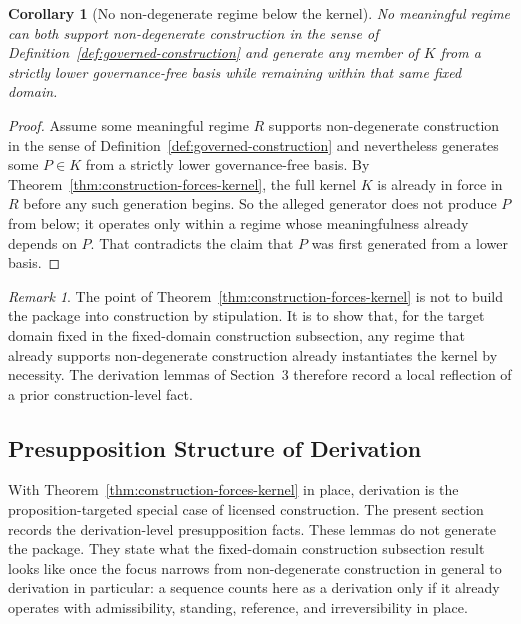 \documentclass[11pt]{article}
\newtheorem{corollary}[theorem]{Corollary}
\theoremstyle{definition}
\theoremstyle{remark}
\newtheorem{remark}[theorem]{Remark}
\begin{document}
\begin{corollary}[No non-degenerate regime below the kernel]\label{cor:no-regime-below-kernel}
No meaningful regime can both support non-degenerate construction in the sense of Definition~\ref{def:governed-construction} and generate any member of $K$ from a strictly lower governance-free basis while remaining within that same fixed domain.
\end{corollary}

\begin{proof}
Assume some meaningful regime $R$ supports non-degenerate construction in the sense of Definition~\ref{def:governed-construction} and nevertheless generates some $P \in K$ from a strictly lower governance-free basis. By Theorem~\ref{thm:construction-forces-kernel}, the full kernel $K$ is already in force in $R$ before any such generation begins. So the alleged generator does not produce $P$ from below; it operates only within a regime whose meaningfulness already depends on $P$. That contradicts the claim that $P$ was first generated from a lower basis.
\end{proof}

\begin{remark}
The point of Theorem~\ref{thm:construction-forces-kernel} is not to build the package into construction by stipulation. It is to show that, for the target domain fixed in the fixed-domain construction subsection, any regime that already supports non-degenerate construction already instantiates the kernel by necessity. The derivation lemmas of Section~3 therefore record a local reflection of a prior construction-level fact.
\end{remark}

\subsection{Presupposition Structure of Derivation}

With Theorem~\ref{thm:construction-forces-kernel} in place, derivation is the proposition-targeted special case of licensed construction. The present section records the derivation-level presupposition facts. These lemmas do not generate the package. They state what the fixed-domain construction subsection result looks like once the focus narrows from non-degenerate construction in general to derivation in particular: a sequence counts here as a derivation only if it already operates with admissibility, standing, reference, and irreversibility in place.
\end{document}
